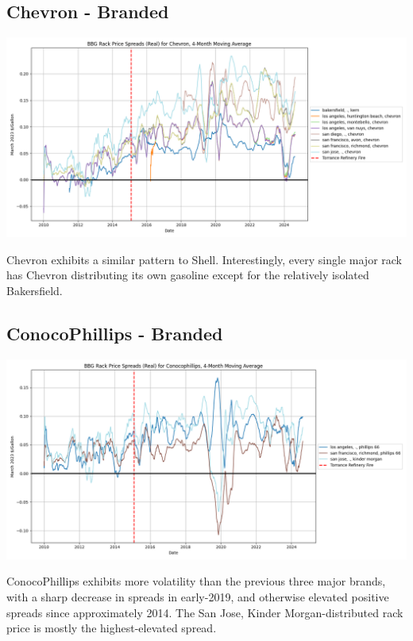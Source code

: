 \documentclass{article}
\begin{document}
\subsection{Chevron - Branded} 
\centering \includegraphics[width=5.5in]{chevron_spread.png} \\ 
\raggedright Chevron exhibits a similar pattern to Shell. Interestingly, every single major rack has Chevron distributing its own gasoline except for the relatively isolated Bakersfield. 

\subsection{ConocoPhillips - Branded} 
\centering \includegraphics[width=5.5in]{conocophillips_spread.png} \\
\raggedright ConocoPhillips exhibits more volatility than the previous three major brands, with a sharp decrease in spreads in early-2019, and otherwise elevated positive spreads since approximately 2014. The San Jose, Kinder Morgan-distributed rack price is mostly the highest-elevated spread.
\end{document}
